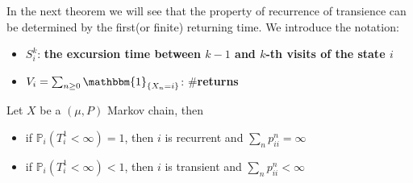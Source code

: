 In the next theorem we will see that the property of recurrence of transience can be determined by the first(or finite) returning time. We introduce the notation:
\begin{itemize}
	\item $S_i^k$: \textbf{the excursion time between $k-1$ and $k$-th visits of the state $i$}
	\item $V_i = \sum_{n \geq 0} \mathbbm{1}_{\{X_n = i\}}$: \textbf{$\#$returns}
\end{itemize}

\begin{theorem}
	Let $X$ be a $(\mu, P)$ Markov chain, then
	\begin{itemize}
		\item if $\mathbb{P}_i(T_i^1 < \infty) = 1$, then $i$ is recurrent and $\sum_n p_{ii}^n = \infty$
		\item if $\mathbb{P}_i(T_i^1 < \infty) < 1$, then $i$ is transient and $\sum_n p_{ii}^n < \infty$
	\end{itemize}
\end{theorem}
